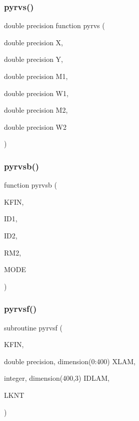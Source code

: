 \mbox{\label{pythia-6_84_824_8f_a78f4bff902221f0851a474a0642ca924}} 
\subsubsection{\texorpdfstring{pyrvs()}{pyrvs()}}
{\footnotesize\ttfamily double precision function pyrvs (\begin{DoxyParamCaption}\item[{double precision}]{X,  }\item[{double precision}]{Y,  }\item[{double precision}]{M1,  }\item[{double precision}]{W1,  }\item[{double precision}]{M2,  }\item[{double precision}]{W2 }\end{DoxyParamCaption})}

\mbox{\label{pythia-6_84_824_8f_abbd1ec6f2beaa101781110b202abb06f}} 
\subsubsection{\texorpdfstring{pyrvsb()}{pyrvsb()}}
{\footnotesize\ttfamily function pyrvsb (\begin{DoxyParamCaption}\item[{}]{K\+F\+IN,  }\item[{}]{I\+D1,  }\item[{}]{I\+D2,  }\item[{}]{R\+M2,  }\item[{}]{M\+O\+DE }\end{DoxyParamCaption})}

\mbox{\label{pythia-6_84_824_8f_aa77e2a4f89c76ba674ab9cac330ec8cd}} 
\subsubsection{\texorpdfstring{pyrvsf()}{pyrvsf()}}
{\footnotesize\ttfamily subroutine pyrvsf (\begin{DoxyParamCaption}\item[{}]{K\+F\+IN,  }\item[{double precision, dimension(0\+:400)}]{X\+L\+AM,  }\item[{integer, dimension(400,3)}]{I\+D\+L\+AM,  }\item[{}]{L\+K\+NT }\end{DoxyParamCaption})}


